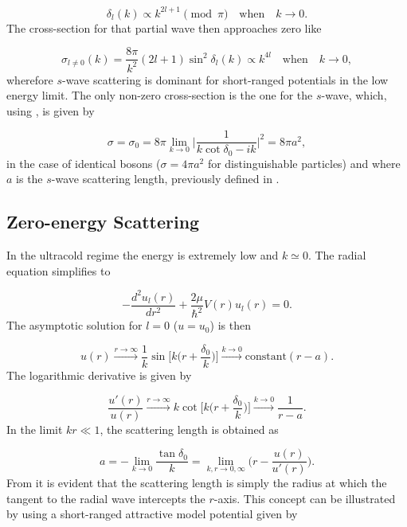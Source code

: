 \begin{equation}
\delta_l(k) \propto k^{2l+1} \pmod{\pi} \quad \text{when} \quad k \rightarrow 0.
\end{equation}
The cross-section for that partial wave then approaches zero like

\begin{equation}
\sigma_{l \neq 0}(k) = \frac{8\pi}{k^2}(2l+1)\sin^2\delta_l(k) \propto k^{4l} \quad \text{when} \quad k \rightarrow 0,
\end{equation}
wherefore $s$-wave scattering is dominant for short-ranged potentials in the low energy limit. The only non-zero cross-section is the one for the $s$-wave, which, using , is given by

\begin{equation}
\sigma = \sigma_0 = 8\pi \lim_{k \to 0} \bigg|\frac{1}{k\cot\delta_0 -ik}\bigg|^2 = 8\pi a^2,
\end{equation}  
in the case of identical bosons ($\sigma = 4\pi a^2 $ for distinguishable particles) and where $a$ is the $s$-wave scattering length, previously defined in .

\subsection{Zero-energy Scattering}\label{sec:zero_energy_scat}
In the ultracold regime the energy is extremely low and $k\simeq0$. The radial equation simplifies to

\begin{equation}
-\frac{d^2 u_l(r)}{dr^2} + \frac{2\mu}{\hbar^2}V(r)u_l(r) = 0.
\end{equation}
The asymptotic solution for $l=0$ ($u = u_0$) is then

\begin{equation}\label{eq:radzero}
u(r) \xrightarrow{ r \to \infty} \frac{1}{k} \sin\bigg[k\Big(r+\frac{\delta_0}{k}\Big)\bigg]  \xrightarrow{k \to 0} \text{constant}(r-a).
\end{equation}
The logarithmic derivative is given by

\begin{equation}
\frac{u'(r)}{u(r)}  \xrightarrow{ r \to \infty} k \cot\bigg[k \Big(r + \frac{\delta_0}{k}\Big)\bigg] \xrightarrow{k \to 0} \frac{1}{r-a}.
\end{equation}
In the limit $kr \ll 1$, the scattering length is obtained as

\begin{equation}
a = -\lim_{k \to 0} \frac{\tan \delta_0 }{k} = \lim_{k,r \to 0,\infty}\Bigg(r-  \frac{u(r)}{u'(r)}\Bigg).
\end{equation}
From  it is evident that the scattering length is simply the radius at which the tangent to the radial wave intercepts the $r$-axis. This concept can be illustrated by using a short-ranged attractive model potential given by

